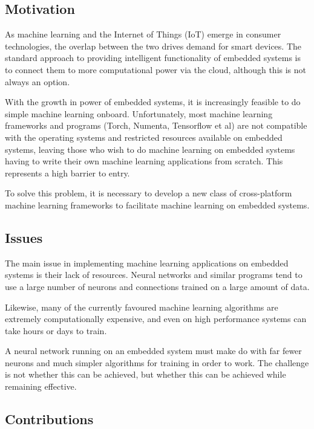 \documentclass[a4paper]{article}
\begin{document}
\subsection{Motivation}%
\label{subsec:in_motivation}

As machine learning and the Internet of Things (IoT) emerge in consumer technologies, the overlap between the two drives demand for smart devices. The standard approach to providing intelligent functionality of embedded systems is to connect them to more computational power via the cloud, although this is not always an option.

With the growth in power of embedded systems, it is increasingly feasible to do simple machine learning onboard. Unfortunately, most machine learning frameworks and programs (Torch, Numenta, Tensorflow et al) are not compatible with the operating systems and restricted resources available on embedded systems, leaving those who wish to do machine learning on embedded systems having to write their own machine learning applications from scratch. This represents a high barrier to entry.

To solve this problem, it is necessary to develop a new class of cross-platform machine learning frameworks to facilitate machine learning on embedded systems.

\subsection{Issues}%
\label{subsec:in_issues}

The main issue in implementing machine learning applications on embedded systems is their lack of resources. Neural networks and similar programs tend to use a large number of neurons and connections trained on a large amount of data.

Likewise, many of the currently favoured machine learning algorithms are extremely computationally expensive, and even on high performance systems can take hours or days to train.

A neural network running on an embedded system must make do with far fewer neurons and much simpler algorithms for training in order to work. The challenge is not whether this can be achieved, but whether this can be achieved while remaining effective.

\subsection{Contributions}%
\label{subsec:in_cs}
\end{document}
